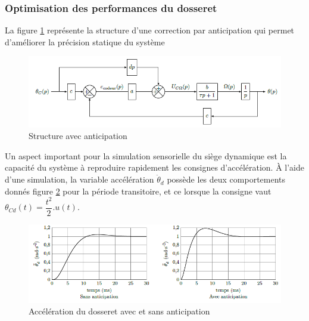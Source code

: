 
\subsubsection{Optimisation des performances du dosseret}

La figure \ref{fig16} représente la structure d'une correction par anticipation qui permet d'améliorer la précision statique du système

\begin{figure}[!ht]
\begin{center}
 \includegraphics[width=0.8\linewidth]{img/img16}
\end{center}
\caption{Structure avec anticipation}
\label{fig16}
\end{figure}



Un aspect important pour la simulation sensorielle du siège dynamique est la capacité du système à reproduire rapidement les consignes d'accélération. À l'aide d'une simulation, la variable accélération $\ddot{\theta}_d$ possède les deux comportements donnés figure \ref{fig17} pour la période transitoire, et ce lorsque la consigne vaut $\theta_{Cd}(t)=\dfrac{t^2}{2}.u(t)$.

\begin{figure}[!ht]
\begin{center}
 \includegraphics[width=0.8\linewidth]{img/img17}
\end{center}
\caption{Accélération du dosseret avec et sans anticipation}
\label{fig17}
\end{figure}

